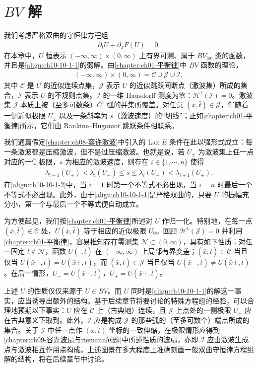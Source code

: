 \documentclass[../../main.tex]{subfiles}
\begin{document}
\section{$BV$ 解}\label{section:ch10-bv解}

我们考虑严格双曲的守恒律方程组
\begin{align}
\partial_t U + \partial_x F(U) = 0.
\label{align:ch10-10-1-1}
\end{align}
在本章中，$U$ 恒表示 $(-\infty,\infty)\times(0,\infty)$ 上有界可测、属于 $BV_{\mathrm{loc}}$ 类的函数，并且是\eqref{align:ch10-10-1-1}的弱解。由\cref{chapter:ch01-平衡律}中 $BV$ 函数的理论，
\begin{align*}
(-\infty,\infty)\times(0,\infty) = \mathscr{C}\cup\mathscr{J}\cup\mathscr{I},
\end{align*}
其中 $\mathscr{C}$ 是 $U$ 的近似连续点集，$\mathscr{J}$ 表示 $U$ 的近似跳跃间断点（激波集）所成的集合，$\mathscr{I}$ 表示 $U$ 的不规则点集。$\mathscr{I}$ 的一维 Hausdorff 测度为零：$\mathscr{H}^{1}(\mathscr{I})=0$。激波集 $\mathscr{J}$ 本质上被（至多可数条）$C^{1}$ 弧的并集所覆盖。对任意 $(\bar{x},\bar{t})\in\mathscr{J}$，伴随着一侧近似极限 $U_{\pm}$ 以及一条斜率为 $s$（激波速度）的“切线”；正如\cref{chapter:ch01-平衡律}所示，它们由 Rankine--Hugoniot 跳跃条件相联系。


我们通篇假定\cref{chapter:ch08-容许激波}中引入的 Lax $E$ 条件在此以强形式成立：每一条激波都是压缩激波，但不是过压缩激波。也就是说，若 $U_{\pm}$ 为激波集上任一点对应的一侧极限，$s$ 为相应的激波速度，则存在 $i\in\{1,\cdots,n\}$ 使得
\begin{align}
\lambda_{i-1}(U_{\pm}) < \lambda_{i}(U_{+}) \leqslant s \leqslant \lambda_{i}(U_{-}) < \lambda_{i+1}(U_{\pm}).
\label{align:ch10-10-1-2}
\end{align}
在\eqref{align:ch10-10-1-2}中，当 $i=1$ 时第一个不等式不必出现，当 $i=n$ 时最后一个不等式不必出现。此外，由于\eqref{align:ch10-10-1-1}是严格双曲的，只要 $U$ 的振幅充分小，第一个与最后一个不等式便自动成立。


为方便起见，我们按\cref{chapter:ch01-平衡律}所述对 $U$ 作归一化。特别地，在每一点 $(\bar{x},\bar{t})\in\mathscr{C}$ 处，$U(\bar{x},\bar{t})$ 等于相应的近似极限 $U_{0}$。回顾 $\mathscr{H}^{1}(\mathscr{J})=0$ 并利用\cref{chapter:ch01-平衡律}，容易推知存在零测集 $\mathcal{N}\subset(0,\infty)$，具有如下性质：对任一固定 $\bar{t}\notin\mathcal{N}$，函数 $U(\cdot,\bar{t})$ 在 $(-\infty,\infty)$ 上局部有界变差；$(\bar{x},\bar{t})\in\mathscr{C}$ 当且仅当 $U(\bar{x}-,\bar{t})=U(\bar{x}+,\bar{t})$，而 $(\bar{x},\bar{t})\in\mathscr{J}$ 当且仅当 $U(\bar{x}-,\bar{t})\neq U(\bar{x}+,\bar{t})$。在后一情形，$U_{-}=U(\bar{x}-,\bar{t})$，$U_{+}=U(\bar{x}+,\bar{t})$。


上述 $U$ 的性质仅仅来源于 $U\in BV$。而 $U$ 同时是\eqref{align:ch10-10-1-1}的解这一事实，应当诱导出额外的结构。基于后续章节将要讨论的特殊方程组的经验，可以合理地预期以下事实：$U$ 应在 $\mathscr{C}$ 上（古典地）连续，且 $\mathscr{J}$ 上点处的一侧极限 $U_{\pm}$ 应在古典意义下取到。此外，$\mathscr{I}$ 应是构成 $\mathscr{J}$ 的那些弧的（至多可数个）端点所成的集合。关于 $\mathscr{I}$ 中任一点作 $(x,t)$ 坐标的一致伸缩，在极限情形应得到\cref{chapter:ch09-容许波扇与riemann问题}中所述性质的波扇，亦即 $\mathscr{I}$ 应由激波生成点与激波相互作用点构成。上述图景在多大程度上准确刻画一般双曲守恒律方程组解的结构，将在后续章节中讨论。
\end{document}
